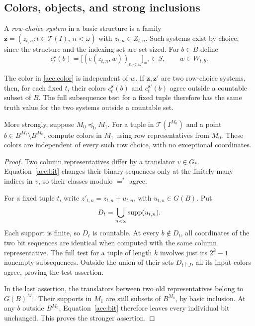 \subsection{Colors, objects, and strong inclusions}

A \emph{row-choice system} in a basic structure is a family
\(\mathbf z=(z_{t,n}:t\in\mathcal T(I),\,n<\omega)\) with
\(z_{t,n}\in Z_{t,n}\).  Such systems exist by choice, since the
structure and the indexing set are set-sized.  For \(b\in B\) define
\begin{equation}\label{aec:color}
 c_t^{\mathbf z}(b)
 =
 \bigl[(e(z_{t,n},w))_{n<\omega}\bigr]_{=^*}\in S,
 \qquad w\in W_{t,b}.
\end{equation}

\begin{lemma}\label{aec:representatives}
The color in \eqref{aec:color} is independent of \(w\).
If \(\mathbf z,\mathbf z'\) are two row-choice systems, then,
for each fixed \(t\), their colors \(c_t^{\mathbf z}(b)\) and
\(c_t^{\mathbf z'}(b)\) agree outside a countable subset of \(B\).
The full subsequence test for a fixed tuple therefore has the
same truth value for the two systems outside a countable set.

More strongly, suppose \(M_0\preccurlyeq_{\mathrm b}M_1\).
For a tuple in \(\mathcal T(I^{M_0})\) and a point
\(b\in B^{M_1}\setminus B^{M_0}\), compute colors in \(M_1\)
using row representatives from \(M_0\).  These colors are
independent of every such row choice, with no exceptional
coordinates.
\end{lemma}

\begin{proof}
Two column representatives differ by a translator \(v\in G_*\).
Equation~\eqref{aec:bit} changes their binary sequences only at
the finitely many indices in \(v\), so their classes modulo
\(=^*\) agree.

For a fixed tuple \(t\), write
\(z'_{t,n}=z_{t,n}+u_{t,n}\), with
\(u_{t,n}\in G(B)\).  Put
\[
 D_t=\bigcup_{n<\omega}\operatorname{supp}(u_{t,n}).
\]
Each support is finite, so \(D_t\) is countable.  At every
\(b\notin D_t\), all coordinates of the two bit sequences are
identical when computed with the same column representative.
The full test for a tuple of length \(k\) involves just its
\(2^k-1\) nonempty subsequences.  Outside the union of their
sets \(D_{t\restriction J}\), all its input colors agree, proving the
test assertion.

In the last assertion, the translators between two old
representatives belong to \(G(B)^{M_0}\).  Their supports in
\(M_1\) are still subsets of \(B^{M_0}\), by basic inclusion.
At any \(b\) outside \(B^{M_0}\), Equation~\eqref{aec:bit}
therefore leaves every individual bit unchanged.  This proves
the stronger assertion.
\end{proof}

